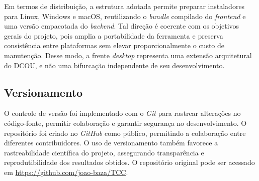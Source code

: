 Em termos de distribuição, a estrutura adotada permite preparar instaladores para Linux, Windows e macOS, reutilizando o \textit{bundle} compilado do \textit{frontend} e uma versão empacotada do \textit{backend}. Tal direção é coerente com os objetivos gerais do projeto, pois amplia a portabilidade da ferramenta e preserva consistência entre plataformas sem elevar proporcionalmente o custo de manutenção. Desse modo, a frente \textit{desktop} representa uma extensão arquitetural do DCOU, e não uma bifurcação independente de seu desenvolvimento.

\subsection{Versionamento}
O controle de versão foi implementado com o \textit{Git} para rastrear alterações no código-fonte, permitir colaboração e garantir segurança no desenvolvimento. O repositório foi criado no \textit{GitHub} como público, permitindo a colaboração entre diferentes contribuidores. O uso de versionamento também favorece a rastreabilidade científica do projeto, assegurando transparência e reprodutibilidade dos resultados obtidos. O repositório original pode ser acessado em \url{https://github.com/joao-baza/TCC}.
